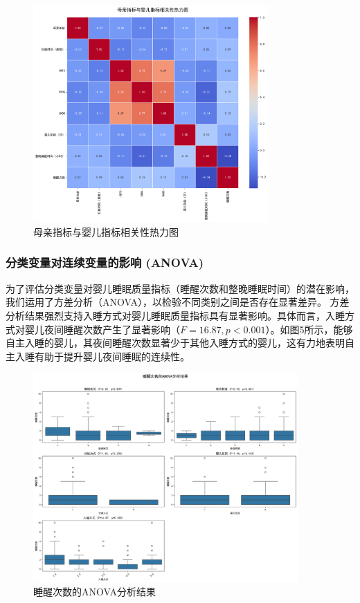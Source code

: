 \documentclass[withoutpreface,bwprint]{cumcmthesis}
\begin{document}
\begin{figure}[htbp]
    \centering
    \includegraphics[width=0.8\textwidth]{figures/correlation_heatmap.png}
    \caption{母亲指标与婴儿指标相关性热力图}
    \label{fig:correlation_heatmap}
\end{figure}

\subsubsection{分类变量对连续变量的影响 (ANOVA)}
为了评估分类变量对婴儿睡眠质量指标（睡醒次数和整晚睡眠时间）的潜在影响，我们运用了方差分析（ANOVA），以检验不同类别之间是否存在显著差异。
方差分析结果强烈支持入睡方式对婴儿睡眠质量指标具有显著影响。具体而言，入睡方式对婴儿夜间睡醒次数产生了显著影响（$F=16.87, p<0.001$）。如图5所示，能够自主入睡的婴儿，其夜间睡醒次数显著少于其他入睡方式的婴儿，这有力地表明自主入睡有助于提升婴儿夜间睡眠的连续性。

\begin{figure}[htbp]
    \centering
    \includegraphics[width=0.9\textwidth]{figures/anova_睡醒次数_combined.png}
    \caption{睡醒次数的ANOVA分析结果}
    \label{fig:anova_wake_up_times}
\end{figure}
\end{document}
